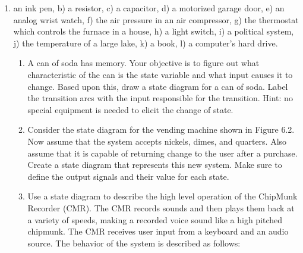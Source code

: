 \begin{enumerate}
\def\labelenumi{\alph{enumi})}
\item
  an ink pen, b) a resistor, c) a capacitor, d) a motorized garage door,
  e) an analog wrist watch, f) the air pressure in an air compressor, g)
  the thermostat which controls the furnace in a house, h) a light
  switch, i) a political system, j) the temperature of a large lake, k)
  a book, l) a computer's hard drive.

  \begin{enumerate}
  \def\labelenumii{\arabic{enumii}.}
  \item
    A can of soda has memory. Your objective is to figure out what
    characteristic of the can is the state variable and what input
    causes it to change. Based upon this, draw a state diagram for a can
    of soda. Label the transition arcs with the input responsible for
    the transition. Hint: no special equipment is needed to elicit the
    change of state.
  \item
    Consider the state diagram for the vending machine shown in Figure
    6.2. Now assume that the system accepts nickels, dimes, and
    quarters. Also assume that it is capable of returning change to the
    user after a purchase. Create a state diagram that represents this
    new system. Make sure to define the output signals and their value
    for each state.
  \item
    Use a state diagram to describe the high level operation of the
    ChipMunk Recorder (CMR). The CMR records sounds and then plays them
    back at a variety of speeds, making a recorded voice sound like a
    high pitched chipmunk. The CMR receives user input from a keyboard
    and an audio source. The behavior of the system is described as
    follows:
  \end{enumerate}
\end{enumerate}


